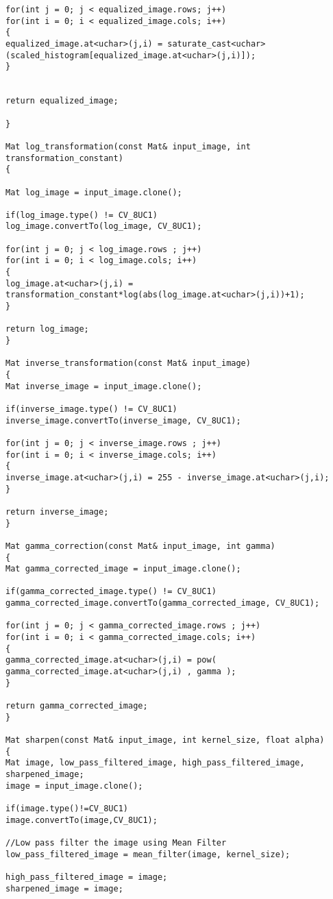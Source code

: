\begin{lstlisting}
for(int j = 0; j < equalized_image.rows; j++)
for(int i = 0; i < equalized_image.cols; i++)
{
equalized_image.at<uchar>(j,i) = saturate_cast<uchar>(scaled_histogram[equalized_image.at<uchar>(j,i)]);
}   


return equalized_image;

}

Mat log_transformation(const Mat& input_image, int transformation_constant)
{

Mat log_image = input_image.clone();

if(log_image.type() != CV_8UC1)
log_image.convertTo(log_image, CV_8UC1);

for(int j = 0; j < log_image.rows ; j++)
for(int i = 0; i < log_image.cols; i++)
{
log_image.at<uchar>(j,i) = transformation_constant*log(abs(log_image.at<uchar>(j,i))+1);
}

return log_image;
}

Mat inverse_transformation(const Mat& input_image)
{
Mat inverse_image = input_image.clone();

if(inverse_image.type() != CV_8UC1)
inverse_image.convertTo(inverse_image, CV_8UC1);

for(int j = 0; j < inverse_image.rows ; j++)
for(int i = 0; i < inverse_image.cols; i++)
{
inverse_image.at<uchar>(j,i) = 255 - inverse_image.at<uchar>(j,i);
}

return inverse_image;
}

Mat gamma_correction(const Mat& input_image, int gamma)
{
Mat gamma_corrected_image = input_image.clone();

if(gamma_corrected_image.type() != CV_8UC1)
gamma_corrected_image.convertTo(gamma_corrected_image, CV_8UC1);

for(int j = 0; j < gamma_corrected_image.rows ; j++)
for(int i = 0; i < gamma_corrected_image.cols; i++)
{
gamma_corrected_image.at<uchar>(j,i) = pow( gamma_corrected_image.at<uchar>(j,i) , gamma );
}

return gamma_corrected_image;
}

Mat sharpen(const Mat& input_image, int kernel_size, float alpha)
{
Mat image, low_pass_filtered_image, high_pass_filtered_image, sharpened_image;
image = input_image.clone();

if(image.type()!=CV_8UC1)
image.convertTo(image,CV_8UC1);  

//Low pass filter the image using Mean Filter
low_pass_filtered_image = mean_filter(image, kernel_size);

high_pass_filtered_image = image;
sharpened_image = image;  


\end{lstlisting}
